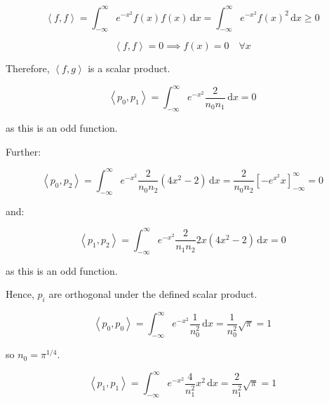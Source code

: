 \documentclass[12pt]{article}
\begin{document}
\begin{equation}
    \left\langle f, f \right\rangle = \int_{-\infty}^{\infty} e^{-x^{2}} f(x) f(x) \, \mathrm{d}x = \int_{-\infty}^{\infty} e^{-x^{2}} f(x)^{2} \, \mathrm{d}x \geq 0
\end{equation}

\begin{equation}
    \left\langle f, f \right\rangle = 0 \implies f(x) = 0 \quad \forall x
\end{equation}

Therefore, $\left\langle f, g \right\rangle$ is a scalar product.


\begin{equation}
    \left\langle p_{0}, p_{1} \right\rangle = \int_{-\infty}^{\infty} e^{-x^{2}} \frac{2}{n_{0} n_{1}} \, \mathrm{d}x = 0
\end{equation}

as this is an odd function.

Further:

\begin{equation}
    \left\langle p_{0}, p_{2} \right\rangle = \int_{-\infty}^{\infty} e^{-x^{2}} \frac{2}{n_{0} n_{2}} (4x^{2} - 2) \, \mathrm{d}x = \frac{2}{n_{0} n_{2}} \left[ -e^{x^{2}} x \right]_{-\infty}^{\infty} = 0
\end{equation}

and:

\begin{equation}
    \left\langle p_{1}, p_{2} \right\rangle = \int_{-\infty}^{\infty} e^{-x^{2}} \frac{2}{n_{1} n_{2}} 2x (4x^{2} - 2) \, \mathrm{d}x = 0
\end{equation}

as this is an odd function.

Hence, $p_{i}$ are orthogonal under the defined scalar product.


\begin{equation}
    \left\langle p_{0}, p_{0} \right\rangle = \int_{-\infty}^{\infty} e^{-x^{2}} \frac{1}{n_{0}^{2}} \, \mathrm{d}x = \frac{1}{n_{0}^{2}} \sqrt{\pi} = 1
\end{equation}

so $n_{0} = \pi^{1/4}$.

\begin{equation}
    \left\langle p_{1}, p_{1} \right\rangle = \int_{-\infty}^{\infty} e^{-x^{2}} \frac{4}{n_{1}^{2}} x^{2} \, \mathrm{d}x = \frac{2}{n_{1}^{2}} \sqrt{\pi} = 1
\end{equation}
\end{document}
